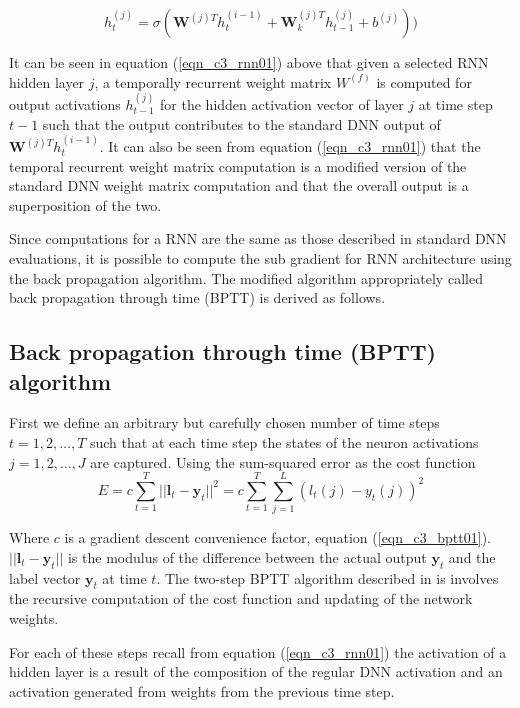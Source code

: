 \begin{equation}h_t^{(j)}=\sigma(\mathbf{W}^{(j)T}h_t^{(i-1)}+\mathbf{W}^{(j)T}_kh_{t-1}^{(j)}+b^{(j)}))
\label{eqn_c3_rnn01}\end{equation}

It can be seen in equation (\ref{eqn_c3_rnn01}) above that given a selected RNN  hidden layer $j$, a temporally recurrent weight matrix $W^{(f)}$ is computed for output activations $h^{(j)}_{t-1}$ for the hidden activation vector of layer $j$ at time step $t - 1$ such that the output contributes to the standard DNN output of  $\mathbf{W}^{(j)T}h_t^{(i-1)}$. It can also be seen from  equation (\ref{eqn_c3_rnn01}) that the temporal recurrent weight matrix computation is a modified version of the standard DNN weight matrix computation and that the overall output is a superposition of the two.

Since computations for a RNN are the same as those described in standard DNN evaluations, it is possible to compute the sub gradient for  RNN architecture using the back propagation algorithm.  The modified algorithm appropriately called back propagation through time (BPTT) \citep{boden2002guide,jaeger2002tutorial} is derived as follows.  
\subsection{Back propagation through time (BPTT) algorithm}

First we define an arbitrary but carefully chosen number of time steps $t=1,2,\dots,T$ such that at each time step the states of the neuron activations $j=1,2,\dots,J$ are captured.
Using the sum-squared error as the cost function
\begin{equation}
E=c\sum_{t=1}^T||\mathbf{l}_t-\mathbf{y}_t||^2=c\sum_{t=1}^T\sum_{j=1}^L(l_t(j)-y_t(j))^2 \label{eqn_c3_bptt01}\end{equation}

Where $c$ is a gradient descent convenience factor, equation (\ref{eqn_c3_bptt01}). $||\mathbf{l}_t-\mathbf{y}_t||$ is the modulus of the difference between the actual output $\mathbf{y}_t$ and the label vector $\mathbf{y}_t$ at time $t$. The two-step BPTT algorithm described in \cite{yu2016automatic} is involves the recursive computation of the cost function and updating of the network weights.

For each of these steps recall from equation (\ref{eqn_c3_rnn01}) the activation of a hidden layer is a result of the composition of the regular DNN activation and an activation generated from weights from the previous time step.

